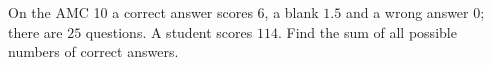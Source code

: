 On the AMC 10 a correct answer scores $6$, a blank $1.5$ and a wrong answer $0$; there are $25$ questions. A student scores $114$. Find the sum of all possible numbers of correct answers.
